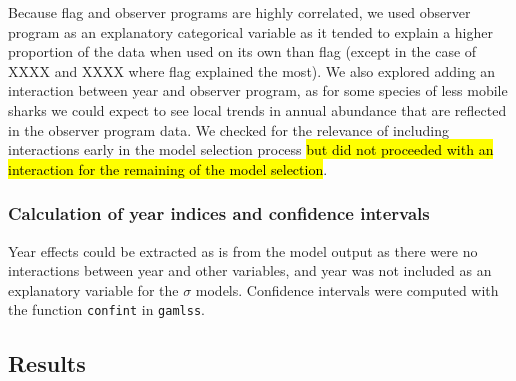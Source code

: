 \documentclass{SCreport}
\begin{document}



Because flag and observer programs are highly correlated, we used
observer program as an explanatory categorical variable as it tended
to explain a higher proportion of the data when used on its own than
flag (except in the case of XXXX and XXXX where flag explained the most). We also explored adding an interaction between year and observer
program, as for some species of less mobile sharks we could expect to
see local trends in annual abundance that are reflected in the
observer program data. We checked for the relevance of including
interactions early in the model selection process \hl{but did not proceeded with
an interaction for the remaining of the model selection}.




\subsubsection{Calculation of year indices and confidence intervals}
Year effects could be extracted as is from the model output as there were no interactions between year and other variables, and year was not included as an explanatory variable for the $\sigma$ models. Confidence intervals were computed with the function \texttt{confint} in \texttt{gamlss}.


\subsection{Results}
\clearpage
\end{document}
